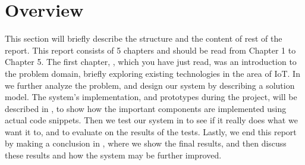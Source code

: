 \section{Overview}\label{sec:overview}
This section will briefly describe the structure and the content of rest of the report. 
This report consists of 5 chapters and should be read from Chapter 1 to Chapter 5. 
The first chapter, , which you have just read, 
was an introduction to the problem domain, 
briefly exploring existing technologies in the area of IoT. 
In  we further analyze the problem, 
and design our system by describing a solution model. 
The system's implementation, and prototypes during the project, 
will be described in , 
to show how the important components are implemented using actual code snippets. 
Then we test our system in  to see if it really does what we want it to, 
and to evaluate on the results of the tests. 
Lastly, we end this report by making a conclusion in , 
where we show the final results, 
and then discuss these results and how the system may be further improved. 
